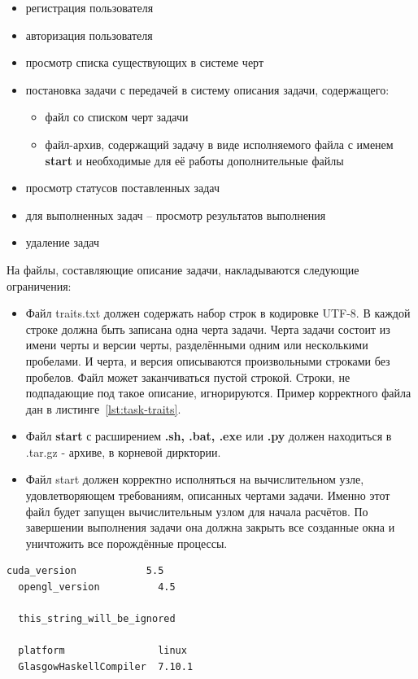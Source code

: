 \documentclass[a4paper,12pt]{report}
\numberwithin{equation}{section}
\begin{document}
  \begin{itemize}
    \item регистрация пользователя
    \item авторизация пользователя
    \item просмотр списка существующих в системе черт
    \item постановка задачи с передачей в систему описания задачи, содержащего:
    \begin{itemize}
      \item файл со списком черт задачи
      \item файл-архив, содержащий задачу в виде исполняемого файла с именем \textbf{start} и необходимые для её работы дополнительные файлы
    \end{itemize}
    \item просмотр статусов поставленных задач
    \item для выполненных задач -- просмотр результатов выполнения
    \item удаление задач
  \end{itemize}
  
  На файлы, составляющие описание задачи, накладываются следующие ограничения:
  
  \begin{itemize}
    \item Файл traits.txt должен содержать набор строк в кодировке UTF-8.
    В каждой строке должна быть записана одна черта задачи.
    Черта задачи состоит из имени черты и версии черты, разделёнными одним или несколькими пробелами. И черта, и версия описываются произвольными строками без пробелов.
    Файл может заканчиваться пустой строкой.
    Строки, не подпадающие под такое описание, игнорируются.
    Пример корректного файла дан в листинге~\ref{lst:task-traits}.
    \item Файл \textbf{start} с расширением \textbf{.sh, .bat, .exe} или \textbf{.py} должен находиться в .tar.gz - архиве, в корневой дирктории.
    \item Файл start должен корректно исполняться на вычислительном узле, удовлетворяющем требованиям, описанных чертами задачи.
    Именно этот файл будет запущен вычислительным узлом для начала расчётов.
    По завершении выполнения задачи она должна закрыть все созданные окна и уничтожить все порождённые процессы.
  \end{itemize}
  
  \begin{lstlisting}[float={},language={},caption={Пример корректного файла со списком черт задачи},label=lst:task-traits]
  cuda_version            5.5
  opengl_version          4.5
  
  this_string_will_be_ignored
  
  platform                linux
  GlasgowHaskellCompiler  7.10.1
  
  \end{lstlisting}
  
\end{document}
